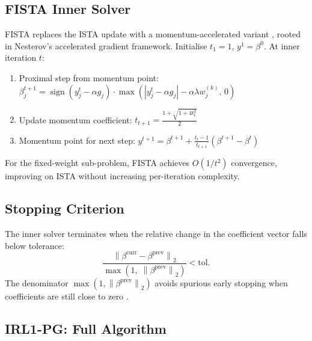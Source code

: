 \documentclass[12pt,a4paper]{article}
\DeclareMathOperator{\sign}{sign}
\newcommand{\norm}[1]{\left\|#1\right\|}
\newcommand{\abs}[1]{\left|#1\right|}
\begin{document}
\subsection{FISTA Inner Solver}

FISTA replaces the ISTA update with a momentum-accelerated variant \citep{beck2009},
rooted in Nesterov's \citeyearpar{nesterov1983} accelerated gradient framework.
Initialise $t_1 = 1$, $y^1 = \beta^0$.  At inner iteration $t$:
\begin{enumerate}[noitemsep]
    \item Proximal step from momentum point:
          $\beta^{t+1}_j = \sign(y^t_j - \alpha g_j) \cdot \max(\abs{y^t_j - \alpha g_j}
          - \alpha\lambda w_j^{(k)},\, 0)$
    \item Update momentum coefficient:
          $t_{t+1} = \frac{1 + \sqrt{1 + 4t_t^2}}{2}$
    \item Momentum point for next step:
          $y^{t+1} = \beta^{t+1} + \frac{t_t - 1}{t_{t+1}}(\beta^{t+1} - \beta^t)$
\end{enumerate}
For the fixed-weight sub-problem, FISTA achieves $O(1/t^2)$ convergence, improving on
ISTA without increasing per-iteration complexity.

\subsection{Stopping Criterion}

The inner solver terminates when the relative change in the coefficient vector falls
below tolerance:
\begin{equation}
    \frac{\norm{\beta^{\mathrm{curr}} - \beta^{\mathrm{prev}}}_2}
         {\max\!\left(1,\; \norm{\beta^{\mathrm{prev}}}_2\right)} < \mathrm{tol}.
    \label{eq:stopping}
\end{equation}
The denominator $\max(1, \norm{\beta^{\mathrm{prev}}}_2)$ avoids spurious early
stopping when coefficients are still close to zero \citep{parikh2014}.

\subsection{IRL1-PG: Full Algorithm}
\end{document}
